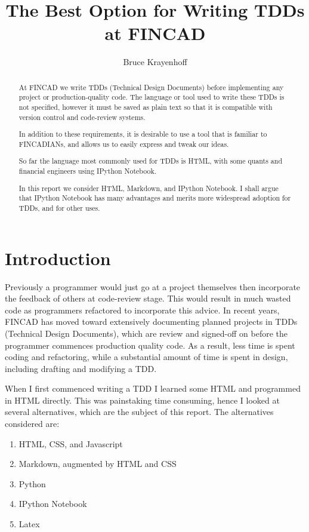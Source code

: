 \documentclass[]{article}
\title{The Best Option for Writing TDDs at FINCAD}
\author{Bruce Krayenhoff}
\begin{document}
\maketitle

\begin{abstract}
At FINCAD we write TDDs (Technical Design Documents) before implementing any project or production-quality code.  The language or tool used to write these TDDs is not specified, however it must be saved as plain text so that it is compatible with version control and code-review systems.

In addition to these requirements, it is desirable to use a tool that is familiar to FINCADIANs, and allows us to easily express and tweak our ideas.

So far the language most commonly used for TDDs is HTML, with some quants and financial engineers using IPython Notebook.

In this report we consider HTML, Markdown, and IPython Notebook.  I shall argue that IPython Notebook has many advantages and merits more widespread adoption for TDDs, and for other uses.
\end{abstract}

\section{Introduction}
Previously a programmer would just go at a project themselves then incorporate the feedback of others at code-review stage.  This would result in much wasted code as programmers refactored to incorporate this advice. In recent years, FINCAD has moved toward extensively documenting planned projects in TDDs (Technical Design Documents), which are review and signed-off on before the programmer commences production quality code.  As a result, less time is spent coding and refactoring, while a substantial amount of time is spent in design, including drafting and modifying a TDD.

When I first commenced writing a TDD I learned some HTML and programmed in HTML directly. This was painstaking time consuming, hence I looked at several alternatives, which are the subject of this report.  The alternatives considered are:

\begin{enumerate}
	\item HTML, CSS, and Javascript
	\item Markdown, augmented by HTML and CSS
	\item Python
	\item IPython Notebook
	\item Latex
\end{enumerate}
\end{document}
